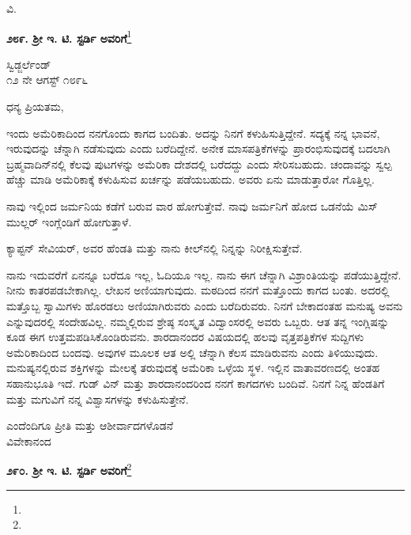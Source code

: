 {\flushright
ವಿ.\par}

\begin{center}
\textbf{೨೮೯. ಶ‍್ರೀ ಇ. ಟಿ. ಸ್ಟರ್ಡಿ ಅವರಿಗೆ}\footnote{}
\end{center}

\begin{flushright}
ಸ್ವಿಡ್ಜರ್ಲೆಂಡ್\\೧೨ ನೇ ಆಗಸ್ಟ್ ೧೮೯೬
\end{flushright}

\noindent
ಧನ್ಯ ಪ್ರಿಯತಮ,

ಇಂದು ಅಮೆರಿಕಾದಿಂದ ನನಗೊಂದು ಕಾಗದ ಬಂದಿತು. ಅದನ್ನು ನಿನಗೆ ಕಳುಹಿಸು\break ತ್ತಿದ್ದೇನೆ. ಸದ್ಯಕ್ಕೆ ನನ್ನ ಭಾವನೆ, ಇರುವುದನ್ನು ಚೆನ್ನಾಗಿ ನಡೆಸುವುದು ಎಂದು ಬರೆದಿದ್ದೇನೆ. ಅನೇಕ ಮಾಸಪತ್ರಿಕೆಗಳನ್ನು ಪ್ರಾರಂಭಿಸುವುದಕ್ಕೆ ಬದಲಾಗಿ ಬ್ರಹ್ಮವಾದಿನ್‌ನಲ್ಲಿ ಕೆಲವು ಪುಟಗಳನ್ನು\enginline{-} ಅಮೆರಿಕಾ ದೇಶದಲ್ಲಿ ಬರೆದದ್ದು\enginline{-} ಎಂದು ಸೇರಿಸಬಹುದು. ಚಂದಾವನ್ನು ಸ್ವಲ್ಪ ಹೆಚ್ಚು ಮಾಡಿ ಅಮೆರಿಕಾಕ್ಕೆ ಕಳುಹಿಸುವ ಖರ್ಚನ್ನು ಪಡೆಯಬಹುದು. ಅವರು ಏನು ಮಾಡುತ್ತಾರೋ ಗೊತ್ತಿಲ್ಲ.

ನಾವು ಇಲ್ಲಿಂದ ಜರ್ಮನಿಯ ಕಡೆಗೆ ಬರುವ ವಾರ ಹೋಗುತ್ತೇವೆ. ನಾವು ಜರ್ಮನಿಗೆ ಹೋದ ಒಡನೆಯೆ ಮಿಸ್ ಮುಲ್ಲರ್ ಇಂಗ್ಲೆಂಡಿಗೆ ಹೋಗುತ್ತಾಳೆ.

ಕ್ಯಾಪ್ಟನ್ ಸೇವಿಯರ್, ಅವರ ಹೆಂಡತಿ ಮತ್ತು ನಾನು ಕೀಲ್‌ನಲ್ಲಿ ನಿನ್ನನ್ನು ನಿರೀಕ್ಷಿಸುತ್ತೇವೆ.


ನಾನು ಇದುವರೆಗೆ ಏನನ್ನೂ ಬರೆದೂ ಇಲ್ಲ, ಓದಿಯೂ ಇಲ್ಲ. ನಾನು ಈಗ ಚೆನ್ನಾಗಿ ವಿಶ್ರಾಂತಿಯನ್ನು ಪಡೆಯುತ್ತಿದ್ದೇನೆ. ನೀನು ಕಾತರಪಡಬೇಕಾಗಿಲ್ಲ. ಲೇಖನ ಅಣಿಯಾಗುವುದು. ಮಠದಿಂದ ನನಗೆ ಮತ್ತೊಂದು ಕಾಗದ ಬಂತು. ಅದರಲ್ಲಿ ಮತ್ತೊಬ್ಬ ಸ್ವಾಮಿಗಳು ಹೊರಡಲು ಅಣಿಯಾಗಿರುವರು ಎಂದು ಬರೆದಿರುವರು. ನಿನಗೆ ಬೇಕಾದಂತಹ ಮನುಷ್ಯ ಅವನು ಎನ್ನುವುದರಲ್ಲಿ ಸಂದೇಹವಿಲ್ಲ. ನಮ್ಮಲ್ಲಿರುವ ಶ್ರೇಷ್ಠ ಸಂಸ್ಕೃತ ವಿದ್ವಾಂಸರಲ್ಲಿ ಅವರು ಒಬ್ಬರು. ಆತ ತನ್ನ ಇಂಗ್ಲಿಷನ್ನು ಕೂಡ ಈಗ ಉತ್ತಮಪಡಿಸಿಕೊಂಡಿರುವನು. ಶಾರದಾನಂದರ ವಿಷಯದಲ್ಲಿ ಹಲವು ವೃತ್ತಪತ್ರಿಕೆಗಳ ಸುದ್ದಿಗಳು ಅಮೆರಿಕಾದಿಂದ ಬಂದವು. ಅವುಗಳ ಮೂಲಕ ಆತ ಅಲ್ಲಿ ಚೆನ್ನಾಗಿ ಕೆಲಸ ಮಾಡಿರುವನು ಎಂದು ತಿಳಿಯುವುದು. ಮನುಷ್ಯನಲ್ಲಿರುವ ಶಕ್ತಿಗಳನ್ನು ಮೇಲಕ್ಕೆ ತರುವುದಕ್ಕೆ ಅಮೆರಿಕಾ ಒಳ್ಳೆಯ ಸ್ಥಳ. ಇಲ್ಲಿನ ವಾತಾವರಣದಲ್ಲಿ ಅಂತಹ ಸಹಾನುಭೂತಿ ಇದೆ. ಗುಡ್ ವಿನ್ ಮತ್ತು ಶಾರದಾನಂದರಿಂದ ನನಗೆ ಕಾಗದಗಳು ಬಂದಿವೆ. ನಿನಗೆ ನಿನ್ನ ಹೆಂಡತಿಗೆ ಮತ್ತು ಮಗುವಿಗೆ ನನ್ನ ವಿಶ್ವಾಸಗಳನ್ನು ಕಳುಹಿಸುತ್ತೇನೆ.

\vspace{0.1cm}

\vspace{-0.3cm}

{\flushright
ಎಂದೆಂದಿಗೂ ಪ್ರೀತಿ ಮತ್ತು ಆಶೀರ್ವಾದಗಳೊಡನೆ\\ವಿವೇಕಾನಂದ\par}

\begin{center}
\textbf{೨೯೦. ಶ‍್ರೀ ಇ. ಟಿ. ಸ್ಟರ್ಡಿ ಅವರಿಗೆ}\footnote{}
\end{center}


